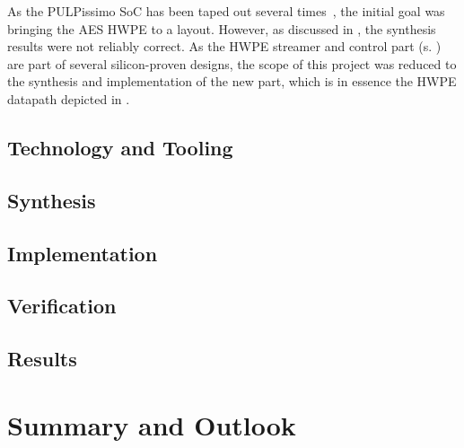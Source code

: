 \documentclass[a4paper, 12pt]{article}
\begin{document}
As the PULPissimo SoC has been taped out several times~\cite{pulp-chips}, the initial goal was bringing the AES HWPE to a layout. However, as discussed in , the synthesis results were not reliably correct. As the HWPE streamer and control part (s. ) are part of several silicon-proven designs, the scope of this project was reduced to the synthesis and implementation of the new part, which is in essence the HWPE datapath depicted in .


\subsection{Technology and Tooling} \label{sec:asic:tools}

\subsection{Synthesis} \label{sec:asic:synthesis}

\subsection{Implementation} \label{sec:asic:synthesis}

\subsection{Verification} \label{sec:asic:verification}

\subsection{Results} \label{sec:asic:results}


\section{Summary and Outlook} \label{sec:summary}


\clearpage
\sloppy
\printbibliography
\end{document}
